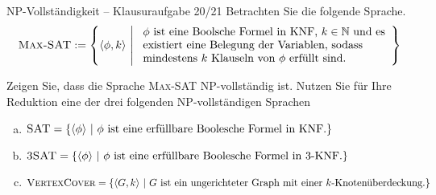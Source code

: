 \documentclass[answers]{submit}
\begin{document}
\begin{exercise}[6]{NP-Vollständigkeit -- Klausuraufgabe 20/21}
  Betrachten Sie die folgende Sprache.
  \[
    \textsc{Max-SAT} :=
    \set{\dtm[\phi,k]}{
      \begin{array}{l}
        \text{$\phi$ ist eine Boolsche Formel in KNF, $k\in\N$ und es} \\
        \text{existiert eine Belegung der Variablen, sodass }          \\
        \text{mindestens $k$ Klauseln von $\phi$ erfüllt sind.}
      \end{array}}
  \]

  Zeigen Sie, dass die Sprache \textsc{Max-SAT} NP-vollständig ist. Nutzen Sie für Ihre Reduktion eine der drei folgenden NP-vollständigen Sprachen
  \begin{enumerate}[a)]
    \item $\textsc{SAT} = \set{\dtm[\phi]}{\text{$\phi$ ist eine erfüllbare Boolesche Formel in KNF.}}$
    \item $\textsc{3SAT} = \set{\dtm[\phi]}{\text{$\phi$ ist eine erfüllbare Boolesche Formel in 3-KNF.}}$
    \item $\textsc{VertexCover} = \set{\dtm[G,k]}{\text{$G$ ist ein ungerichteter Graph mit einer $k$-Knotenüberdeckung.}}$
  \end{enumerate}
\end{exercise}
\end{document}
